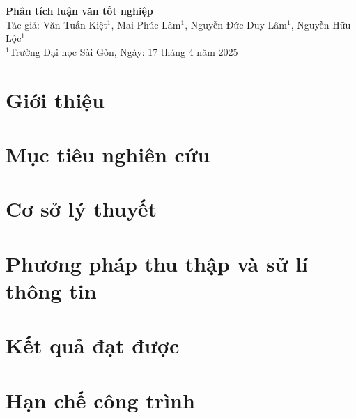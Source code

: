 \documentclass{article}
\begin{document}
\begin{center}
    \textbf{\Large Phân tích luận văn tốt nghiệp} \\
    \vspace{0.5cm}
    \normalsize Tác giả: Văn Tuấn Kiệt$^1$, Mai Phúc Lâm$^1$, Nguyễn Đức Duy Lâm$^1$, Nguyễn Hữu Lộc$^1$ \\
    \vspace{0.2cm}
    $^1$Trường Đại học Sài Gòn,
    \vspace{0.2cm}
    Ngày: 17 tháng 4 năm 2025 \\
    \vspace{0.2cm}
\end{center}

\section{Giới thiệu}

\section{Mục tiêu nghiên cứu}

\section{Cơ sở lý thuyết}

\section{Phương pháp thu thập và sử lí thông tin}

\section{Kết quả đạt được}

\section{Hạn chế công trình}

\end{document}
